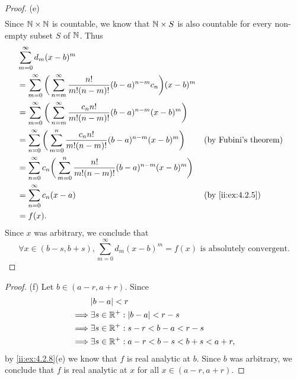 \begin{proof}{(e)}
\begin{align*}
  \end{align*}
  Since \(\mathbb{N} \times \mathbb{N}\) is countable, we know that \(\mathbb{N} \times S\) is also countable for every non-empty subset \(S\) of \(\mathbb{N}\).
  Thus
  \begin{align*}
     & \sum_{m = 0}^\infty d_m (x - b)^m                                                                                                             \\
     & = \sum_{m = 0}^\infty \bigg(\sum_{n = m}^\infty \dfrac{n!}{m! (n - m)!} (b - a)^{n - m} c_n\bigg) (x - b)^m                                   \\
     & = \sum_{m = 0}^\infty \bigg(\sum_{n = m}^\infty \dfrac{c_n n!}{m! (n - m)!} (b - a)^{n - m} (x - b)^m\bigg)                                   \\
     & = \sum_{n = 0}^\infty \bigg(\sum_{m = 0}^n \dfrac{c_n n!}{m! (n - m)!} (b - a)^{n - m} (x - b)^m\bigg)      &  & \text{(by Fubini's theorem)} \\
     & = \sum_{n = 0}^\infty c_n \bigg(\sum_{m = 0}^n \dfrac{n!}{m! (n - m)!} (b - a)^{n - m} (x - b)^m\bigg)                                        \\
     & = \sum_{n = 0}^\infty c_n (x - a)                                                                           &  & \by{ii:ex:4.2.5}             \\
     & = f(x).
  \end{align*}
  Since \(x\) was arbitrary, we conclude that
  \[
    \forall x \in (b - s, b + s), \sum_{m = 0}^\infty d_m (x - b)^m = f(x) \text{ is absolutely convergent}.
  \]
\end{proof}

\begin{proof}{(f)}
  Let \(b \in (a - r, a + r)\).
  Since
  \begin{align*}
             & \abs{b - a} < r                                     \\
    \implies & \exists s \in \R^+ : \abs{b - a} < r - s            \\
    \implies & \exists s \in \R^+ : s - r < b - a < r - s          \\
    \implies & \exists s \in \R^+ : a - r < b - s < b + s < a + r,
  \end{align*}
  by \cref{ii:ex:4.2.8}(e) we know that \(f\) is real analytic at \(b\).
  Since \(b\) was arbitrary, we conclude that \(f\) is real analytic at \(x\) for all \(x \in (a - r, a + r)\).
\end{proof}
